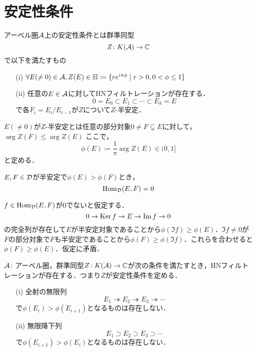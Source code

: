 \section{安定性条件}
	

\begin{defn}\cite{Bristab}
		アーベル圏${\mathcal A}$上の安定性条件とは群準同型
		\[Z\colon K({\mathcal A})\to {\mathbb C}\]
		で以下を満たすもの
\begin{itemize}
	\item[(i)]
		$\forall E(\neq 0)\in{\mathcal A}, Z(E)\in{\mathbb H}\coloneq \{re^{i\pi\phi}\mid r>0, 0<\phi \le 1\}$
	\item[(ii)]
		任意の$E\in{\mathcal A}$に対してHNフィルトレーションが存在する．
		\[0=E_0\subset E_1\subset \cdots \subset E_k = E\]
		で各$F_i = E_i/E_{i-1}$が$Z$について$Z$-半安定．
\end{itemize}
$E(\neq 0)$が$Z$-半安定とは任意の部分対象$0\neq F\subsetneq E$に対して，$\arg Z(F) \le \arg Z(E)$
ここで，
\[\phi(E)\coloneq \frac{1}{\pi}\arg Z(E)\in (0,1] \]
と定める．
\end{defn}	

\begin{lemm}
	$E,F\in{\mathcal D}$が半安定で$\phi(E)>\phi(F)$とき，
	\[\operatorname{\mathrm{Hom}}_{{\mathcal D}}(E,F)=0\]
\end{lemm}
\begin{pf}
	$f\in\operatorname{\mathrm{Hom}}_{{\mathcal D}}(E,F)$が$0$でないと仮定する．
	\[0\rightarrow\operatorname{Ker} f\rightarrow E \rightarrow \Im f \rightarrow 0\]
	の完全列が存在して$E$が半安定対象であることから$\phi(\Im f)\ge\phi(E)$．$\Im f\neq 0$が$F$の部分対象で$F$も半安定であることから$\phi(F)\ge\phi(\Im f)$．これらを合わせると$\phi(F)\ge\phi(E)$．仮定に矛盾．
\end{pf}

\begin{lemm}\cite{Bristab}
		${\mathcal A}\colon$アーベル圏，群準同型$Z\colon K({\mathcal A})\to {\mathbb C}$が次の条件を満たすとき，HNフィルトレーションが存在する．つまり$Z$が安定性条件を定める．
		\begin{itemize}
			\item[(i)]
			全射の無限列
		\[E_1\twoheadrightarrow E_2\twoheadrightarrow E_3\twoheadrightarrow\cdots  \]
		で$\phi (E_i)> \phi (E_{i+1})$となるものは存在しない．
	\item[(ii)]
			無限降下列
		\[E_1\supset E_2\supset E_3\supset \cdots  \]
		で$\phi (E_{i+1}) > \phi(E_i)$となるものは存在しない．
	\end{itemize}
\end{lemm}


